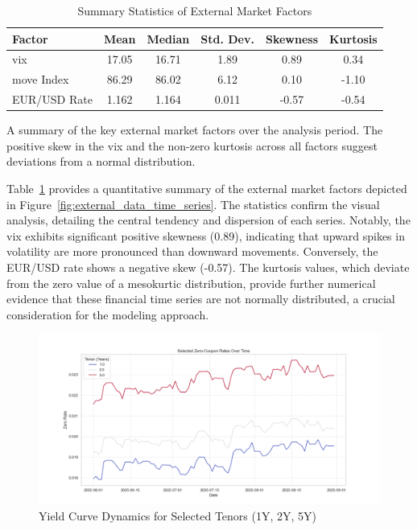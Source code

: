 \begin{table}[H]
	\centering
	\begin{threeparttable}
		\caption{Summary Statistics of External Market Factors}
		\label{tab:external_summary}
		\begin{tabular}{lccccc}
			\toprule
			\textbf{Factor} & \textbf{Mean} & \textbf{Median} & \textbf{Std. Dev.} & \textbf{Skewness} & \textbf{Kurtosis} \\
			\midrule
			\ac{vix}        & 17.05         & 16.71           & 1.89               & 0.89              & 0.34              \\
			\ac{move} Index & 86.29         & 86.02           & 6.12               & 0.10              & -1.10             \\
			EUR/USD Rate    & 1.162         & 1.164           & 0.011              & -0.57             & -0.54             \\
			\bottomrule
		\end{tabular}
		\begin{tablenotes}
			\footnotesize
			\item  A summary of the key external market factors over the analysis period. The positive skew in the \ac{vix} and the non-zero kurtosis across all factors suggest deviations from a normal distribution.
		\end{tablenotes}
	\end{threeparttable}
\end{table}


Table~\ref{tab:external_summary} provides a quantitative summary of the external market factors depicted in Figure~\ref{fig:external_data_time_series}. The statistics confirm the visual analysis, detailing the central tendency and dispersion of each series. Notably, the \ac{vix} exhibits significant positive skewness (0.89), indicating that upward spikes in volatility are more pronounced than downward movements. Conversely, the EUR/USD rate shows a negative skew (-0.57). The kurtosis values, which deviate from the zero value of a mesokurtic distribution, provide further numerical evidence that these financial time series are not normally distributed, a crucial consideration for the modeling approach.

\begin{figure}[H]
	\centering
	\includegraphics[width=1\textwidth]{images/descriptive_data_analysis/yield_curve_selected_tenors.png}
	\caption{Yield Curve Dynamics for Selected Tenors (1Y, 2Y, 5Y)}
	\label{fig:yield_curve_selected_tenors}
\end{figure}

